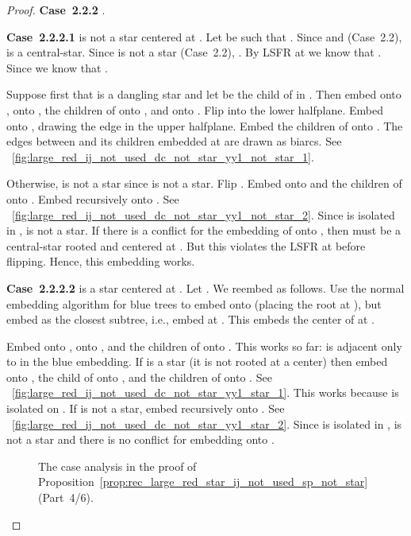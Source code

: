 \documentclass[11pt,a4paper,colorlinks=true,urlcolor=blue,citecolor=red]{article}
\theoremstyle{plain}
\newcommand{\case}[1]{\par\vspace{.5\baselineskip}\noindent\textbf{\sffamily Case~#1}}
\begin{document}
\begin{proof}
  \case{2.2.2} .

  \case{2.2.2.1}  is not a star centered at . Let  be
  such that . Since 
  and  (Case~2.2),  is a central-star. Since
   is not a star (Case~2.2), . By LSFR at 
  we know that . Since  we know that
  .

  Suppose first that  is a dangling star and let  be the child of
   in . Then embed  onto ,  onto , the children of
   onto , and  onto . Flip  into the lower
  halfplane. Embed  onto , drawing the edge  in the
  upper halfplane. Embed the children of  onto . The
  edges between  and its children embedded at  are drawn
  as biarcs. See
  \figurename~\ref{fig:large_red_ij_not_used_dc_not_star_yy1_not_star_1}.

  Otherwise,  is not a star since  is not a star. Flip
  . Embed  onto  and the children of  onto
  . Embed  recursively onto . See
  \figurename~\ref{fig:large_red_ij_not_used_dc_not_star_yy1_not_star_2}.
  Since  is isolated in ,  is not a star. If there is
  a conflict for the embedding of  onto , then
   must be a central-star rooted and centered at
  . But this violates the LSFR at  before flipping. Hence, this
  embedding works.



  \case{2.2.2.2}  is a star centered at . Let
  . We reembed  as follows. Use the normal
  embedding algorithm for blue trees to embed  onto 
  (placing the root at ), but embed  as the closest subtree,
  i.e., embed  at . This embeds the center of  at
  .

  Embed  onto ,  onto , and the children of  onto
  . This works so far:  is adjacent only to  in the
  blue embedding. If  is a star (it is not rooted at a center) then
  embed  onto , the child  of  onto , and the children
  of  onto . See
  \figurename~\ref{fig:large_red_ij_not_used_dc_not_star_yy1_star_1}.
  This works because  is isolated on . If  is not a
  star, embed  recursively onto . See
  \figurename~\ref{fig:large_red_ij_not_used_dc_not_star_yy1_star_2}.
  Since  is isolated in ,  is not a star and
  there is no conflict for embedding  onto .


  \begin{figure}
    \centering\hfil {}\hfil {}\hfil {}\hfil \caption{The case analysis in the proof of
      Proposition~\ref{prop:rec_large_red_star_ij_not_used_sp_not_star}~(Part~4/6).}
  \end{figure}



\end{proof}
\end{document}
